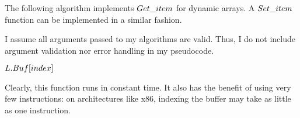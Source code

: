 \HdrDynArrayImpl

The following algorithm implements $\FuncGetItem$ for dynamic arrays. A $Set\_item$ function can be implemented in a similar fashion.

{\HdrNote} I assume all arguments passed to my algorithms are valid. Thus, I do not include argument validation nor error handling in my pseudocode.

\begin{algorithm}
	\begin{algorithmic}[1]
		\Function{$\FuncGetItem$}{$\VarList, \ParamIndex$}
			\State \Return $L.Buf[index]$
		\EndFunction
	\end{algorithmic}
\end{algorithm}

Clearly, this function runs in constant time. It also has the benefit of using very few instructions: on architectures like x86, indexing the buffer may take as little as one instruction.